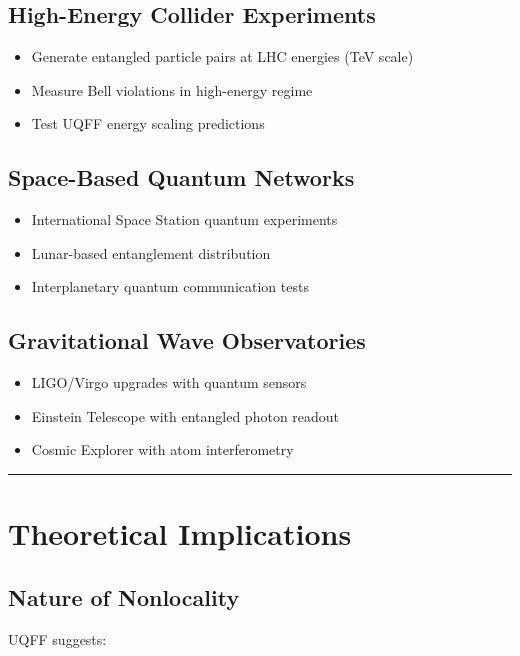 \documentclass[12pt,a4paper]{article}
\begin{document}
\subsection{High-Energy Collider Experiments}

\begin{itemize}
  \item Generate entangled particle pairs at LHC energies (TeV scale)
  \item Measure Bell violations in high-energy regime
  \item Test UQFF energy scaling predictions
\end{itemize}

\subsection{Space-Based Quantum Networks}

\begin{itemize}
  \item International Space Station quantum experiments
  \item Lunar-based entanglement distribution
  \item Interplanetary quantum communication tests
\end{itemize}

\subsection{Gravitational Wave Observatories}

\begin{itemize}
  \item LIGO/Virgo upgrades with quantum sensors
  \item Einstein Telescope with entangled photon readout
  \item Cosmic Explorer with atom interferometry
\end{itemize}

\medskip\hrule\medskip

\section{Theoretical Implications}

\subsection{Nature of Nonlocality}

UQFF suggests:
\end{document}
